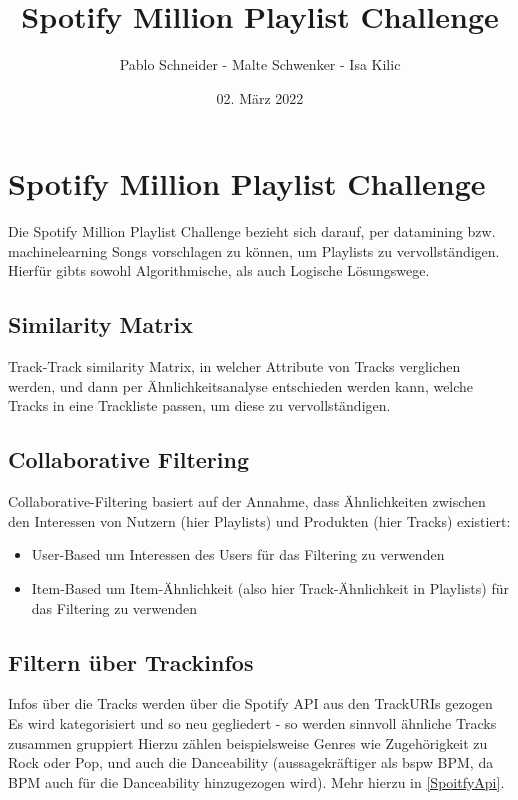 \documentclass[12pt]{article}
\title{Spotify Million Playlist Challenge}
\author{Pablo Schneider - Malte Schwenker - Isa Kilic}
\date{02. März 2022}
\begin{document}
\maketitle
\renewcommand{\contentsname}{Inhaltsverzeichnis}

\begin{center}
\tableofcontents
\end{center}
\newpage
\section{Spotify Million Playlist Challenge}

Die Spotify Million Playlist Challenge bezieht sich darauf, per datamining bzw. machinelearning Songs vorschlagen zu können, um Playlists zu vervollständigen. Hierfür gibts sowohl Algorithmische, als auch Logische Lösungswege.

\subsection{Similarity Matrix}
Track-Track similarity Matrix, in welcher Attribute von Tracks verglichen werden, und dann per Ähnlichkeitsanalyse entschieden werden kann, welche Tracks in eine Trackliste passen, um diese zu vervollständigen.

\subsection{Collaborative Filtering}
Collaborative-Filtering basiert auf der Annahme, dass Ähnlichkeiten zwischen den Interessen von Nutzern (hier Playlists) und Produkten (hier Tracks) existiert:

\begin{itemize}
    \renewcommand{\labelitemi}{$\rightarrow}
    \item User-Based um Interessen des Users für das Filtering zu verwenden
    \item Item-Based um Item-Ähnlichkeit (also hier Track-Ähnlichkeit in Playlists) für das Filtering zu verwenden
\end{itemize}


\subsection{Filtern über Trackinfos}
Infos über die Tracks werden über die Spotify API aus den TrackURIs gezogen Es wird kategorisiert und so neu gegliedert - so werden sinnvoll ähnliche Tracks zusammen gruppiert Hierzu zählen beispielsweise Genres wie Zugehörigkeit zu Rock oder Pop, und auch die Danceability (aussagekräftiger als bspw BPM, da BPM auch für die Danceability hinzugezogen wird). Mehr hierzu in \ref{SpoitfyApi}.
\end{document}
